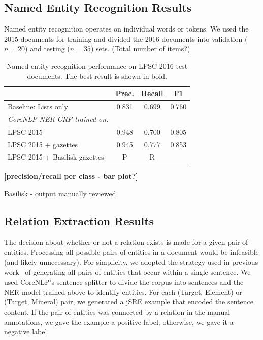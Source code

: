 \documentclass[letterpaper]{article} %
\begin{document}

\subsection{Named Entity Recognition Results}

Named entity recognition operates on individual words or tokens.  We
used the 2015 documents for training and divided the 2016 documents
into validation ($n=20$) and testing ($n=35$) sets.  (Total number of
items?) 

\begin{table}
\caption{Named entity recognition performance on LPSC 2016 test documents.  
The best result is shown in bold.}
\label{tab:ner}
\begin{center}
\begin{tabular}{l|ccc}
 & Prec. & Recall & F1 \\ \hline
Baseline: Lists only & 0.831 & 0.699 & 0.760 \\ \hline  %
{\em CoreNLP NER CRF trained on:} & & \\
LPSC 2015            & 0.948 & 0.700 & 0.805 \\
LPSC 2015 + gazettes & 0.945 & 0.777 & 0.853 \\
LPSC 2015 + Basilisk gazettes & P & R \\
\hline
\end{tabular}
\end{center}
\end{table}

{\bf [precision/recall per class - bar plot?]}

Basilisk - output manually reviewed

\subsection{Relation Extraction Results}

The decision about whether or not a relation exists is made for a
given pair of entities.  Processing all possible pairs of entities in
a document would be infeasible (and likely unnecessary).  For
simplicity, we adopted the strategy used in previous
work~\cite{giuliano:jsre06} of generating all pairs of entities that
occur within a single sentence.  We used CoreNLP's sentence splitter
to divide the corpus into sentences and the NER model trained above to
identify entities.  For each (Target, Element) or (Target, Mineral)
pair, we generated a jSRE example that encoded the sentence content.
If the pair of entities was connected by a relation in the manual
annotations, we gave the example a positive label; otherwise, we gave
it a negative label.
\end{document}
